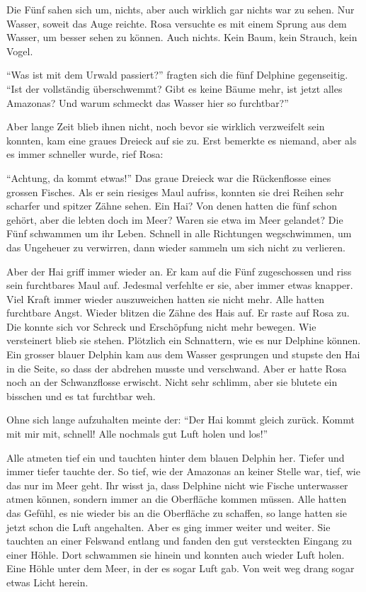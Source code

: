 Die Fünf sahen sich um, nichts, aber auch wirklich gar nichts war zu sehen. Nur Wasser, soweit das Auge reichte. Rosa versuchte es mit einem Sprung aus dem Wasser, um besser sehen zu können. Auch nichts. Kein Baum, kein Strauch, kein Vogel.

\enquote{Was ist mit dem Urwald passiert?} fragten sich die fünf Delphine gegenseitig. \enquote{Ist der vollständig überschwemmt? Gibt es keine Bäume mehr, ist jetzt alles Amazonas? Und warum schmeckt das Wasser hier so furchtbar?} 

Aber lange Zeit blieb ihnen nicht, noch bevor sie wirklich verzweifelt sein konnten, kam eine graues Dreieck auf sie zu. Erst bemerkte es niemand, aber als es immer schneller wurde, rief Rosa:

\enquote{Achtung, da kommt etwas!} Das graue Dreieck war die Rückenflosse eines grossen Fisches. Als er sein riesiges Maul aufriss, konnten sie drei Reihen sehr scharfer und spitzer Zähne sehen. Ein Hai? Von denen hatten die fünf schon gehört, aber die lebten doch im Meer? Waren sie etwa im Meer gelandet? Die Fünf schwammen um ihr Leben. Schnell in alle Richtungen wegschwimmen, um das Ungeheuer zu verwirren, dann wieder sammeln um sich nicht zu verlieren. 

Aber der Hai griff immer wieder an. Er kam auf die Fünf zugeschossen und riss sein furchtbares Maul auf. Jedesmal verfehlte er sie, aber immer etwas knapper. Viel Kraft immer wieder auszuweichen hatten sie nicht mehr. Alle hatten furchtbare Angst. Wieder blitzen die Zähne des Hais auf. Er raste auf Rosa zu. Die konnte sich vor Schreck und Erschöpfung nicht mehr bewegen. Wie versteinert blieb sie stehen. Plötzlich ein Schnattern, wie es nur Delphine können. Ein grosser blauer Delphin kam aus dem Wasser gesprungen und stupste den Hai in die Seite, so dass der abdrehen musste und verschwand. Aber er hatte Rosa noch an der Schwanzflosse erwischt. Nicht sehr schlimm, aber sie blutete ein bisschen und es tat furchtbar weh.

Ohne sich lange aufzuhalten meinte der: \enquote{Der Hai kommt gleich zurück. Kommt mit mir mit, schnell! Alle nochmals gut Luft holen und los!}

Alle atmeten tief ein und tauchten hinter dem blauen Delphin her. Tiefer und immer tiefer tauchte der. So tief, wie der Amazonas an keiner Stelle war, tief, wie das nur im Meer geht. Ihr wisst ja, dass Delphine nicht wie Fische unterwasser atmen können, sondern immer an die Oberfläche kommen müssen. Alle hatten das Gefühl, es nie wieder bis an die Oberfläche zu schaffen, so lange hatten sie jetzt schon die Luft angehalten. Aber es ging immer weiter und weiter. Sie tauchten an einer Felswand entlang und fanden den gut versteckten Eingang zu einer Höhle. Dort schwammen sie hinein und konnten auch wieder Luft holen. Eine Höhle unter dem Meer, in der es sogar Luft gab. Von weit weg drang sogar etwas Licht herein.

